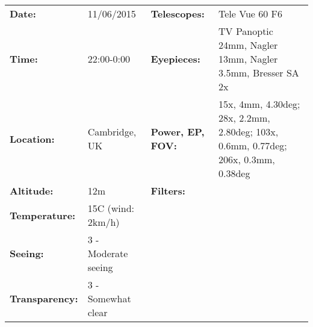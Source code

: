 \begin{tabular}{ p{0.9in} p{1.3in} p{1.2in} p{5.2in}}
{\bf Date:} & 11/06/2015 & {\bf Telescopes:} & Tele Vue 60 F6 \\ 
{\bf Time:} & 22:00-0:00 & {\bf Eyepieces:} & TV Panoptic 24mm, Nagler 13mm, Nagler 3.5mm, Bresser SA 2x \\ 
{\bf Location:} & Cambridge, UK & {\bf Power, EP, FOV:} & 15x, 4mm, 4.30deg; 28x, 2.2mm, 2.80deg; 103x, 0.6mm, 0.77deg; 206x, 0.3mm, 0.38deg \\ 
{\bf Altitude:} & 12m & {\bf Filters:} &  \\ 
{\bf Temperature:} & 15C (wind: 2km/h) & & \\ 
{\bf Seeing:} & 3 - Moderate seeing & & \\ 
{\bf Transparency:} & 3 - Somewhat clear & & \\ 
\end{tabular}
\centering 
